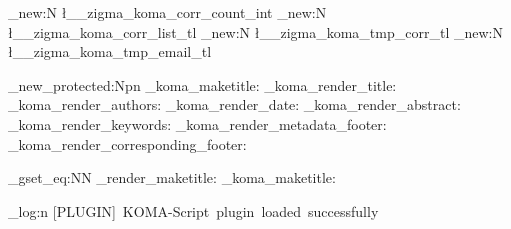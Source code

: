 \int_new:N \l__zigma_koma_corr_count_int
\tl_new:N \l__zigma_koma_corr_list_tl
\tl_new:N \l__zigma_koma_tmp_corr_tl
\tl_new:N \l__zigma_koma_tmp_email_tl


\cs_new_protected:Npn \zigma_koma_maketitle:
  {
    \if@twocolumn
    \else
      \zigma_koma_render_title:
      \zigma_koma_render_authors:
      \zigma_koma_render_date:
      \zigma_koma_render_abstract:
      \zigma_koma_render_keywords:
        \zigma_koma_render_metadata_footer:
      \zigma_koma_render_corresponding_footer:
    \fi
  }

\cs_gset_eq:NN \zigma_render_maketitle: \zigma_koma_maketitle:

\zigma_log:n { [PLUGIN]~KOMA-Script~plugin~loaded~successfully }

\ExplSyntaxOff

\endinput
